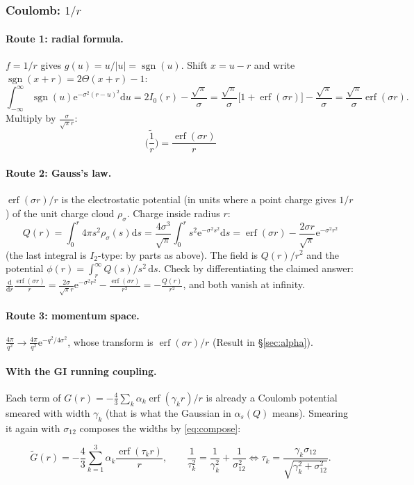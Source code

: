 \documentclass[11pt,a4paper]{article}
\numberwithin{equation}{section}
\theoremstyle{definition}
\theoremstyle{plain}
\theoremstyle{remark}
\newenvironment{keyresult}[1][Key result]{\begin{tcolorbox}[keybox,title={\small\bfseries #1},fonttitle=\small,coltitle=white,colbacktitle=MidnightBlue!70]}{\end{tcolorbox}}
\numberwithin{algorithm}{section}
\newcommand{\as}{\alpha_s}
\newcommand{\dd}{\mathrm{d}}
\newcommand{\ee}{\mathrm{e}}
\newcommand{\erf}{\operatorname{erf}}
\newcommand{\sgn}{\operatorname{sgn}}
\begin{document}
\subsubsection{\texorpdfstring{Coulomb: $1/r$}{Coulomb: 1/r}}\label{sec:smcoul}
\paragraph{Route 1: radial formula.} $f=1/r$ gives $g(u)=u/|u|=\sgn(u)$. Shift $x=u-r$ and write $\sgn(x+r)=2\Theta(x+r)-1$:
\begin{equation*}
\int_{-\infty}^\infty\sgn(u)\ee^{-\sigma^2(r-u)^2}\dd u=2I_0(r)-\frac{\sqrt\pi}{\sigma}=\frac{\sqrt\pi}{\sigma}\big[1+\erf(\sigma r)\big]-\frac{\sqrt\pi}{\sigma}=\frac{\sqrt\pi}{\sigma}\erf(\sigma r).
\end{equation*}
Multiply by $\frac{\sigma}{\sqrt\pi r}$:
\begin{equation}
\boxed{\ \widetilde{\Big(\frac1r\Big)}=\frac{\erf(\sigma r)}{r}\ }
\end{equation}
\paragraph{Route 2: Gauss's law.} $\erf(\sigma r)/r$ is the electrostatic potential (in units where a point charge gives $1/r$) of the unit charge cloud $\rho_\sigma$. Charge inside radius $r$:
\begin{equation*}
Q(r)=\int_0^r4\pi s^2\rho_\sigma(s)\dd s=\frac{4\sigma^3}{\sqrt\pi}\int_0^rs^2\ee^{-\sigma^2s^2}\dd s=\erf(\sigma r)-\frac{2\sigma r}{\sqrt\pi}\ee^{-\sigma^2r^2}
\end{equation*}
(the last integral is $I_2$-type: by parts as above). The field is $Q(r)/r^2$ and the potential $\phi(r)=\int_r^\infty Q(s)/s^2\,\dd s$. Check by differentiating the claimed answer: $\frac{\dd}{\dd r}\frac{\erf(\sigma r)}{r}=\frac{2\sigma}{\sqrt\pi r}\ee^{-\sigma^2r^2}-\frac{\erf(\sigma r)}{r^2}=-\frac{Q(r)}{r^2}$, and both vanish at infinity.
\paragraph{Route 3: momentum space.} $\frac{4\pi}{q^2}\to\frac{4\pi}{q^2}\ee^{-q^2/4\sigma^2}$, whose transform is $\erf(\sigma r)/r$ (Result in \S\ref{sec:alpha}).

\paragraph{With the GI running coupling.} Each term of $G(r)=-\frac43\sum_k\alpha_k\erf(\gamma_kr)/r$ is already a Coulomb potential smeared with width $\gamma_k$ (that is what the Gaussian in $\as(Q)$ means). Smearing it again with $\sigma_{12}$ composes the widths by \eqref{eq:compose}:
\begin{keyresult}[Smeared Coulomb potential with running coupling]
\begin{equation}
\tilde G(r)=-\frac43\sum_{k=1}^3\alpha_k\frac{\erf(\tau_kr)}{r},\qquad \frac1{\tau_k^2}=\frac1{\gamma_k^2}+\frac1{\sigma_{12}^2}\iff\tau_k=\frac{\gamma_k\sigma_{12}}{\sqrt{\gamma_k^2+\sigma_{12}^2}} .
\end{equation}
\end{keyresult}
\end{document}
